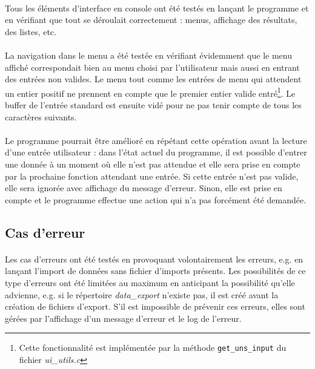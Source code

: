 \documentclass{article}
\begin{document}
    \paragraph{}
    Tous les éléments d'interface en console ont été testés en lançant le programme et en vérifiant que tout se déroulait correctement : menus, affichage des résultats, des listes, etc.

    \paragraph{}
    La navigation dans le menu a été testée en vérifiant évidemment que le menu affiché correspondait bien au menu choisi par l'utilisateur mais aussi en entrant des entrées non valides. Le menu tout comme les entrées de menu qui attendent un entier positif ne prennent en compte que le premier entier valide entré\footnote{Cette fonctionnalité est implémentée par la méthode \texttt{get\_uns\_input} du fichier \emph{ui\_utils.c}}. Le buffer de l'entrée standard est ensuite vidé pour ne pas tenir compte de tous les caractères suivants.

    \paragraph{}
    Le programme pourrait être amélioré en répétant cette opération avant la lecture d'une entrée utilisateur : dans l'état actuel du programme, il est possible d'entrer une donnée à un moment où elle n'est pas attendue et elle sera prise en compte par la prochaine fonction attendant une entrée. Si cette entrée n'est pas valide, elle sera ignorée avec affichage du message d'erreur. Sinon, elle est prise en compte et le programme effectue une action qui n'a pas forcément été demandée.


    \subsection{Cas d'erreur}
    \paragraph{}
    Les cas d'erreurs ont été testés en provoquant volontairement les erreurs, e.g. en lançant l'import de données sans fichier d'imports présents. Les possibilités de ce type d'erreurs ont été limitées au maximum en anticipant la possibilité qu'elle advienne, e.g. si le répertoire \emph{data\_export} n'existe pas, il est créé avant la création de fichiers d'export. S'il est impossible de prévenir ces erreurs, elles sont gérées par l'affichage d'un message d'erreur et le log de l'erreur.
\end{document}
